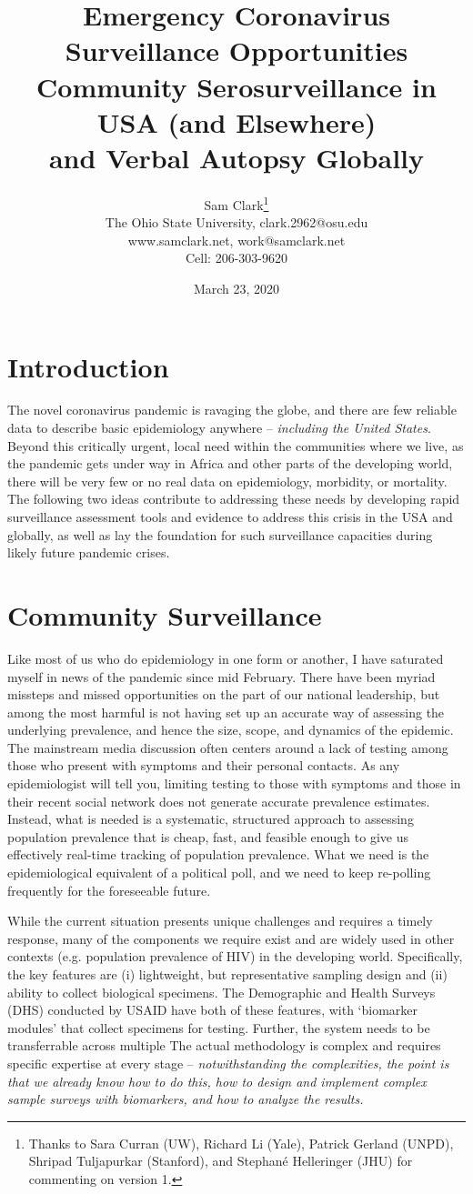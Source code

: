 \documentclass[12pt]{article}
\title{Emergency Coronavirus Surveillance Opportunities\\[10pt] \large{Community Serosurveillance in USA (and Elsewhere)\\ and Verbal Autopsy Globally}}
\author{Sam Clark\thanks{Thanks to Sara Curran (UW), Richard Li (Yale), Patrick Gerland (UNPD), Shripad Tuljapurkar (Stanford), and Stephan\'e Helleringer (JHU) for commenting on version 1.}\\
The Ohio State University, clark.2962@osu.edu\\
www.samclark.net, work@samclark.net\\
Cell: 206-303-9620}
\date{March 23, 2020}
\begin{document}
\maketitle


\section{Introduction}

The novel coronavirus pandemic is ravaging the globe, and there are few reliable data to describe basic epidemiology anywhere -- \textit{including the United States}.  Beyond this critically urgent, local need within the communities where we live, as the pandemic gets under way in Africa and other parts of the developing world, there will be very few or no real data on epidemiology, morbidity, or mortality.  The following two ideas contribute to addressing these needs by developing rapid surveillance assessment tools and evidence to address this crisis in the USA and globally, as well as lay the foundation for such surveillance capacities during likely future pandemic crises.


\section{Community Surveillance}

Like most of us who do epidemiology in one form or another, I have saturated myself in news of the pandemic since mid February.  There have been myriad missteps and missed opportunities on the part of our national leadership, but among the most harmful is not having set up an accurate way of assessing the underlying prevalence, and hence the size, scope, and dynamics of the epidemic.  The mainstream media discussion often centers around a lack of testing among those who present with symptoms and their personal contacts.  As any epidemiologist will tell you, limiting testing to those with symptoms and those in their recent social network does not generate accurate prevalence estimates.  Instead, what is needed is a systematic, structured approach to assessing population prevalence that is cheap, fast, and feasible enough to give us effectively real-time tracking of population prevalence.  What we need is the epidemiological equivalent of a political poll, and we need to keep re-polling frequently for the foreseeable future.

While the current situation presents unique challenges and requires a timely response, many of the components we require exist and are widely used in other contexts (e.g. population prevalence of HIV) in the developing world.  Specifically, the key features are (i) lightweight, but representative sampling design and (ii) ability to collect biological specimens. The Demographic and Health Surveys (DHS) conducted by USAID have both of these features, with `biomarker modules' that collect specimens for testing.  Further, the system needs to be transferrable across multiple The actual methodology is complex and requires specific expertise at every stage -- \textit{notwithstanding the complexities, the point is that we already know how to do this, how to design and implement complex sample surveys with biomarkers, and how to analyze the results.}
\end{document}
